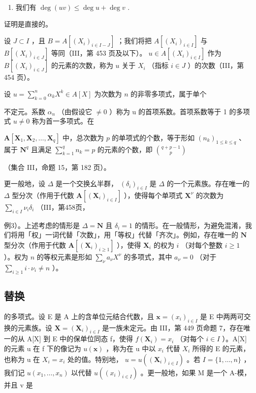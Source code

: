 \begin{enumerate}
\def\labelenumi{(\roman{enumi})}
\setcounter{enumi}{1}
\tightlist
\item
  我们有 \(\deg(uv) \leqslant \deg u + \deg v\) .
\end{enumerate}

证明是直接的。

设 \(J \subset I\) ，且 \(B = A[(X_i)_{i \in I - J}]\) ；我们将把 \(A[(X_i)_{i \in I}]\) 与 \(B[(X_i)_{i \in J}]\) 等同（III，第 453 页及以下）。 \(u \in A[(X_i)_{i \in I}]\) 作为 \(B[(X_i)_{i \in J}]\) 的元素的次数，称为 \(u\) 关于 \(X_i\) （指标 \(i \in J\) ）的次数（III，第 454 页）。

设 \(u = \sum_{k=0}^{n} \alpha_k X^k \in A[X]\) 为次数为 \(n\) 的非零多项式，属于单个

不定元。系数 \(\alpha_{n}\) （由假设它 \(\neq0\) ）称为 u 的首项系数。首项系数等于 1 的多项式 \(u\neq0\) 称为首一多项式。在

 \(\mathbf{A}[\mathbf{X}_1, \mathbf{X}_2, \ldots, \mathbf{X}_q]\) 中，总次数为 \(p\) 的单项式的个数，等于形如 \((n_k)_{1 \leqslant k \leqslant q}\) 、属于 \(\mathbf{N}^q\) 且满足 \(\sum_{k=1}^{q} n_k = p\) 的元素的个数，即 \(\binom{q + p - 1}{p}\)

（集合 III，命题 15，第 182 页）。

更一般地，设 \(\Delta\) 是一个交换幺半群， \((\delta_i)_{i \in I}\) 是 \(\Delta\) 的一个元素族。存在唯一的 \(\Delta\) 型分次（作用于代数 \(\mathbf{A}[(\mathbf{X}_i)_{i \in I}]\) ），使得每个单项式 \(\mathbf{X}^\nu\) 的次数为 \(\sum_{i \in I} \nu_i \delta_i\) （III，第458页，

例3）。上述考虑的情形是 \(\Delta = \mathbf{N}\) 且 \(\delta_{i} = 1\) 的情形。在一般情形，为避免混淆，我们将用「权」一词代替「次数」，用「等权」代替「齐次」。例如，存在唯一的 \(\mathbf{N}\) 型分次（作用于代数 \(\mathbf{A}[(\mathbf{X}_{i})_{i\geqslant 1}]\) ），使得 \(\mathbf{X}_i\) 的权为 \(i\) （对每个整数 \(i \geqslant 1\) ）。权为 \(n\) 的等权元素是形如 \(\sum_{\nu} a_{\nu} X^{\nu}\) 的多项式，其中 \(a_{\nu} = 0\) （对于 \(\sum_{i \geqslant 1} i \cdot \nu_i \neq n\) ）。

\subsection{替换}

的多项式。设 E 是 A 上的含单位元结合代数，且 \(\mathbf{x} = (x_{i})_{i \in I}\) 是 E 中两两可交换的元素族。设 \(\mathbf{X} = (\mathbf{X}_{i})_{i \in I}\) 是一族未定元。由 III，第 449 页命题 7，存在唯一的从 A{[}X{]} 到 E 中的保单位同态 f，使得 \(f(\mathbf{X}_{i}) = x_{i}\) （对每个 \(i \in I\) ）。A{[}X{]} 的元素 u 在 f 下的像记为 \(u(\mathbf{x})\) ，称为在 u 中以 \(x_{i}\) 代替 \(X_{i}\) 所得的 E 的元素，也称为 u 在 \(X_{i} = x_{i}\) 处的值。特别地， \(u = u((\mathbf{X}_{i})_{i \in I})\) 。若 \(I = \{1, \ldots, n\}\) ，我们记 \(u(x_{1}, \ldots, x_{n})\) 以代替 \(u((x_{i})_{i \in I})\) 。更一般地，如果 M 是一个 A-模，并且 v 是

